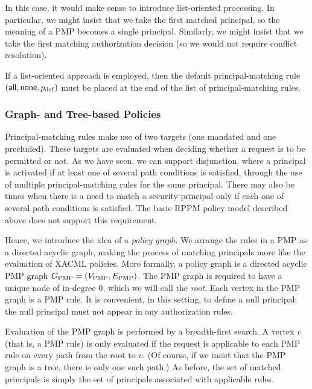 \documentclass{article}
\begin{document}
In this case, it would make sense to introduce list-oriented processing.
In particular, we might insist that we take the first matched principal, so the meaning of a PMP becomes a single principal.
Similarly, we might insist that we take the first matching authorization decision (so we would not require conflict resolution).

If a list-oriented approach is employed, then the default principal-matching rule $(\mathsf{all},\mathsf{none},p_{\rm def})$ must be placed at the end of the list of principal-matching rules.

\subsubsection{Graph- and Tree-based Policies}\label{sec:model:policy-extensions:tree-based-policies}

\newcommand{\sbpmp}{\ensuremath{_{\rm PMP}}}

Principal-matching rules make use of two targets (one mandated and one precluded).
These targets are evaluated when deciding whether a request is to be permitted or not.
As we have seen, we can support disjunction, where a principal is activated if at least one of several path conditions is satisfied, through the use of multiple principal-matching rules for the same principal.
There may also be times when there is a need to match a security principal only if each one of several path conditions is satisfied.
The basic RPPM policy model described above does not support this requirement.

Hence, we introduce the idea of a \emph{policy graph}.
We arrange the rules in a PMP as a directed acyclic graph, making the process of matching principals more like the evaluation of XACML policies.
More formally, a policy graph is a directed acyclic PMP graph $G\sbpmp = (V\sbpmp,E\sbpmp)$.
The PMP graph is required to have a unique node of in-degree $0$, which we will call the \emph{root}.
Each vertex in the PMP graph is a PMP rule.
It is convenient, in this setting, to define a {\sf null} principal; the {\sf null} principal must not appear in any authorization rules.

Evaluation of the PMP graph is performed by a breadth-first search.
A vertex $v$ (that is, a PMP rule) is only evaluated if the request is applicable to each PMP rule on every path from the root to $v$.
(Of course, if we insist that the PMP graph is a tree, there is only one such path.)
As before, the set of matched principals is simply the set of principals associated with applicable rules.
\end{document}
